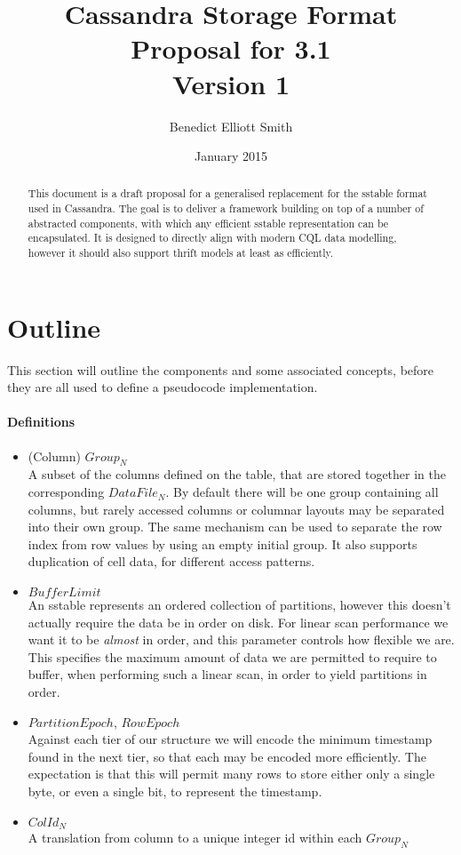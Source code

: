 \documentclass[fleqn]{article}
\title{Cassandra Storage Format\\Proposal for 3.1\\Version 1}
\author{Benedict Elliott Smith}
\date{January 2015}
\begin{document}
\maketitle

\begin{abstract}
This document is a draft proposal for a generalised replacement for the sstable format used in Cassandra.
The goal is to deliver a framework building on top of a number of abstracted components, with which
any efficient sstable representation can be encapsulated. It is designed to directly align with modern CQL
data modelling, however it should also support thrift models at least as efficiently.
\end{abstract}

\section{Outline}
\small
This section will outline the components and some associated concepts, before they are all used to define a pseudocode implementation.
\\
\paragraph{Definitions}
\begin{itemize}
  \item (Column) $Group_N$\\[2pt]
    A subset of the columns defined on the table, that are stored together in the 
     corresponding $DataFile_N$. By default there will be one group containing all columns, 
     but rarely accessed columns or columnar layouts may be separated into their own group.
     The same mechanism can be used to separate the row index from row values by using
     an empty initial group. It also supports duplication of cell data, for different access
     patterns.
  \item $BufferLimit$\\[2pt]
    An sstable represents an ordered collection of partitions, however this doesn't
    actually require the data be in order on disk. For linear scan performance we want it
    to be \emph{almost} in order, and this parameter controls how flexible we are.
    This specifies the maximum amount of data we are permitted to require to buffer, 
    when performing such a linear scan, in order to yield partitions in order.
  \item $PartitionEpoch$, $RowEpoch$\\[2pt]
    Against each tier of our structure we will encode the minimum timestamp found in the next
    tier, so that each may be encoded more efficiently. The expectation is that this will permit 
    many rows to store either only a single byte, or even a single bit, to represent the timestamp.
  \item $ColId_N$\\[2pt]
    A translation from column to a unique integer id within each $Group_N$
    
\end{itemize}
\end{document}
